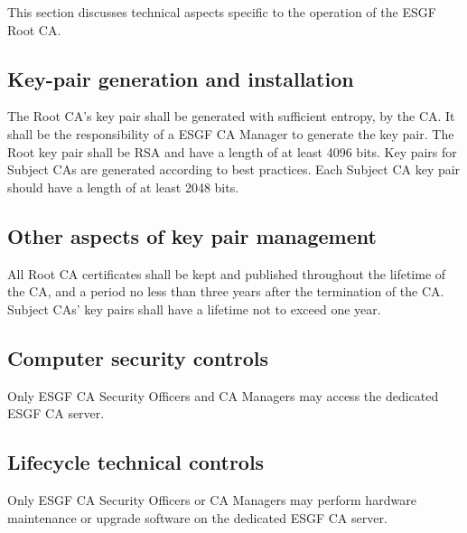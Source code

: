 This section discusses technical aspects specific to the operation of
the ESGF Root CA.

\subsection{Key-pair generation and installation}\label{key-pair-generation-and-installation}

The Root CA's key pair shall be generated with sufficient entropy, by the CA. It shall be the responsibility of a ESGF CA Manager to generate the key pair. The Root key pair shall be RSA and have a length of at least 4096 bits. Key pairs for Subject CAs are
generated according to best practices. Each Subject CA key pair should
have a length of at least 2048 bits.

\subsection{Other aspects of key pair management}\label{other-aspects-of-key-pair-management}

All Root CA certificates shall be kept and published throughout the
lifetime of the CA, and a period no less than three years after the
termination of the CA. Subject CAs' key pairs shall have a lifetime not
to exceed one year.

\subsection{Computer security controls}\label{computer-security-controls}

Only ESGF CA Security Officers and CA Managers may access the dedicated
ESGF CA server.

\subsection{Lifecycle technical controls}\label{life-cycle-technical-controls}

Only ESGF CA Security Officers or CA Managers may perform hardware
maintenance or upgrade software on the dedicated ESGF CA server.

